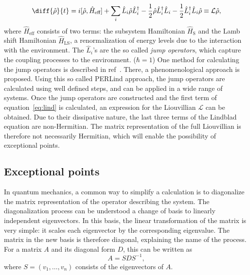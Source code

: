 \documentclass[../main.tex]{subfiles}
\begin{document}
\begin{equation}\label{eq:lind}
    \diff{\hat\rho}{t} = i[\hat\rho, \hat H_\text{eff}] + \sum_i \hat L_i\hat\rho\hat L_i^\dag - \frac{1}{2}\hat\rho\hat L_i^\dag\hat L_i - \frac{1}{2}\hat L_i^\dag\hat L_i \hat\rho \equiv \mathcal{L}\hat\rho,
\end{equation}
where $\hat H_\text{eff}$ consists of two terms: the subsystem Hamiltonian $\hat H_\text{S}$ and the Lamb shift Hamiltonian $\hat H_\text{LS}$, a renormalization of energy levels due to the interaction with the environment. The $\hat L_i$'s are the so called \textit{jump operators}, which capture the coupling processes to the environment. ($\hbar=1$) One method for calculating the jump operators is described in ref~\cite{perlind}. There, a phenomenological approach is proposed. Using this so called PERLind approach, the jump operators are calculated using well defined steps, and can be applied in a wide range of systems. Once the jump operators are constructed and the first term of equation~\eqref{eq:lind} is calculated, an expression for the Liouvillian $\mathcal{L}$ can be obtained. Due to their dissipative nature, the last three terms of the Lindblad equation are non-Hermitian. The matrix representation of the full Liouvillian is therefore not necessarily Hermitian, which will enable the possibility of exceptional points.




\subsection{Exceptional points}\label{sec:ep}
In quantum mechanics, a common way to simplify a calculation is to diagonalize the matrix representation of the operator describing the system. The diagonalization process can be understood a change of basis to linearly independent eigenvectors. In this basis, the linear transformation of the matrix is very simple: it scales each eigenvector by the corresponding eigenvalue. The matrix in the new basis is therefore diagonal, explaining the name of the process. For a matrix $A$ and its diagonal form $D$, this can be written as 
\begin{equation}
    A = SDS^{-1},
\end{equation}
where $S = (v_1, \dots ,v_n)$ consists of the eigenvectors of $A$.
\end{document}

